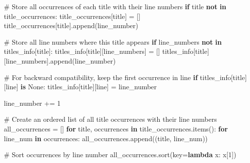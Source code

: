 \documentclass[
  11pt,
  letterpaper,
]{book}
\newenvironment{Shaded}{\begin{snugshade}}{\end{snugshade}}
\newcommand{\CommentTok}[1]{\textcolor[rgb]{0.37,0.37,0.37}{#1}}
\newcommand{\ControlFlowTok}[1]{\textcolor[rgb]{0.00,0.23,0.31}{\textbf{#1}}}
\newcommand{\DecValTok}[1]{\textcolor[rgb]{0.68,0.00,0.00}{#1}}
\newcommand{\KeywordTok}[1]{\textcolor[rgb]{0.00,0.23,0.31}{\textbf{#1}}}
\newcommand{\NormalTok}[1]{\textcolor[rgb]{0.00,0.23,0.31}{#1}}
\newcommand{\OperatorTok}[1]{\textcolor[rgb]{0.37,0.37,0.37}{#1}}
\newcommand{\StringTok}[1]{\textcolor[rgb]{0.13,0.47,0.30}{#1}}
\newcommand{\VariableTok}[1]{\textcolor[rgb]{0.07,0.07,0.07}{#1}}
\begin{document}
\begin{Shaded}
\begin{Highlighting}[]
        \CommentTok{\# Store all occurrences of each title with their line numbers}
        \ControlFlowTok{if}\NormalTok{ title }\KeywordTok{not} \KeywordTok{in}\NormalTok{ title\_occurrences:}
\NormalTok{            title\_occurrences[title] }\OperatorTok{=}\NormalTok{ []}
\NormalTok{        title\_occurrences[title].append(line\_number)}

        \CommentTok{\# Store all line numbers where this title appears}
        \ControlFlowTok{if} \StringTok{\textquotesingle{}line\_numbers\textquotesingle{}} \KeywordTok{not} \KeywordTok{in}\NormalTok{ titles\_info[title]:}
\NormalTok{            titles\_info[title][}\StringTok{\textquotesingle{}line\_numbers\textquotesingle{}}\NormalTok{] }\OperatorTok{=}\NormalTok{ []}
\NormalTok{        titles\_info[title][}\StringTok{\textquotesingle{}line\_numbers\textquotesingle{}}\NormalTok{].append(line\_number)}

        \CommentTok{\# For backward compatibility, keep the first occurrence in \textquotesingle{}line\textquotesingle{}}
        \ControlFlowTok{if}\NormalTok{ titles\_info[title][}\StringTok{\textquotesingle{}line\textquotesingle{}}\NormalTok{] }\KeywordTok{is} \VariableTok{None}\NormalTok{:}
\NormalTok{            titles\_info[title][}\StringTok{\textquotesingle{}line\textquotesingle{}}\NormalTok{] }\OperatorTok{=}\NormalTok{ line\_number}

\NormalTok{        line\_number }\OperatorTok{+=} \DecValTok{1}

    \CommentTok{\# Create an ordered list of all title occurrences with their line numbers}
\NormalTok{    all\_occurrences }\OperatorTok{=}\NormalTok{ []}
    \ControlFlowTok{for}\NormalTok{ title, occurrences }\KeywordTok{in}\NormalTok{ title\_occurrences.items():}
        \ControlFlowTok{for}\NormalTok{ line\_num }\KeywordTok{in}\NormalTok{ occurrences:}
\NormalTok{            all\_occurrences.append((title, line\_num))}

    \CommentTok{\# Sort occurrences by line number}
\NormalTok{    all\_occurrences.sort(key}\OperatorTok{=}\KeywordTok{lambda}\NormalTok{ x: x[}\DecValTok{1}\NormalTok{])}


\end{Highlighting}
\end{Shaded}
\end{document}
